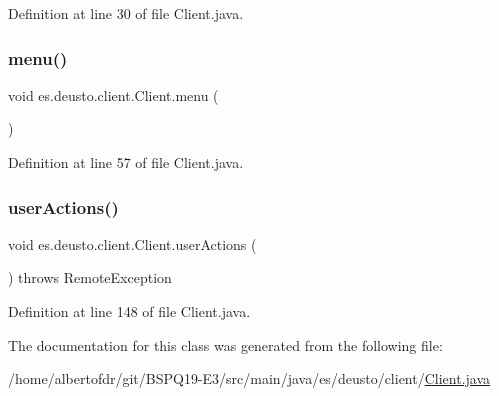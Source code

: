Definition at line 30 of file Client.\+java.

\mbox{\label{classes_1_1deusto_1_1client_1_1_client_a8fdee4eb01bf96421c91a0bc1fbdcb43}} 
\subsubsection{\texorpdfstring{menu()}{menu()}}
{\footnotesize\ttfamily void es.\+deusto.\+client.\+Client.\+menu (\begin{DoxyParamCaption}{ }\end{DoxyParamCaption})\hspace{0.3cm}{\ttfamily [protected]}}



Definition at line 57 of file Client.\+java.

\mbox{\label{classes_1_1deusto_1_1client_1_1_client_a08731e01aee74e27a7a55ae48c636c84}} 
\subsubsection{\texorpdfstring{user\+Actions()}{userActions()}}
{\footnotesize\ttfamily void es.\+deusto.\+client.\+Client.\+user\+Actions (\begin{DoxyParamCaption}{ }\end{DoxyParamCaption}) throws Remote\+Exception\hspace{0.3cm}{\ttfamily [protected]}}



Definition at line 148 of file Client.\+java.



The documentation for this class was generated from the following file\+:\begin{DoxyCompactItemize}
\item 
/home/albertofdr/git/\+B\+S\+P\+Q19-\/\+E3/src/main/java/es/deusto/client/\hyperlink{_client_8java}{Client.\+java}\end{DoxyCompactItemize}
